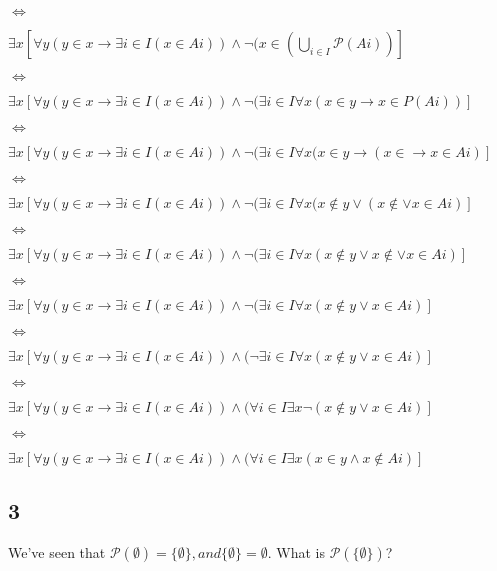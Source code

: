 \documentclass{article}
\begin{document}
\begin{enumerate}[label=(\alph*)]
    $\Leftrightarrow$
    
    $\exists x[\forall y (y \in x \rightarrow \exists i \in I  (x \in Ai)) \land \neg (x \in (\bigcup_{i \in I}\mathscr{P}(Ai))]$
    
    $\Leftrightarrow$
    
    $\exists x[\forall y (y \in x \rightarrow \exists i \in I  (x \in Ai)) \land \neg (\exists i \in  I \forall x (x \in y  \rightarrow x \in P (Ai))]$
    
    $\Leftrightarrow$
    
    $\exists x[\forall y (y \in x \rightarrow \exists i \in I  (x \in Ai)) \land \neg (\exists i \in  I \forall x (x \in y  \rightarrow (x \in \rightarrow x \in Ai)]$
    
    $\Leftrightarrow$
    
    $\exists x[\forall y (y \in x \rightarrow \exists i \in I  (x \in Ai)) \land \neg (\exists i \in  I \forall x (x \notin y  \lor (x \notin \lor x \in Ai)]$
    
    $\Leftrightarrow$
    
    $\exists x[\forall y (y \in x \rightarrow \exists i \in I  (x \in Ai)) \land \neg (\exists i \in  I \forall x (x \notin y  \lor x \notin \lor x \in Ai)]$
    
    $\Leftrightarrow$
    
    $\exists x[\forall y (y \in x \rightarrow \exists i \in I  (x \in Ai)) \land \neg (\exists i \in  I \forall x ( x \notin y \lor x \in Ai)]$
    
    $\Leftrightarrow$
    
    $\exists x[\forall y (y \in x \rightarrow \exists i \in I  (x \in Ai)) \land (\neg \exists i \in  I \forall x ( x \notin y \lor x \in Ai)]$
    
    $\Leftrightarrow$
    
    $\exists x[\forall y (y \in x \rightarrow \exists i \in I  (x \in Ai)) \land (\forall i \in  I \exists x \neg ( x \notin y \lor x \in Ai)]$
    
    $\Leftrightarrow$
    
    $\exists x[\forall y (y \in x \rightarrow \exists i \in I  (x \in Ai)) \land (\forall i \in  I \exists x  ( x \in y \land x \notin Ai)]$
\end{enumerate}
\subsection{3}
We’ve seen that $\mathscr{P}(\emptyset) = \{ \emptyset \}, and \{ \emptyset \} = \emptyset$. What is $\mathscr{P}(\{ \emptyset \})$?
\end{document}
